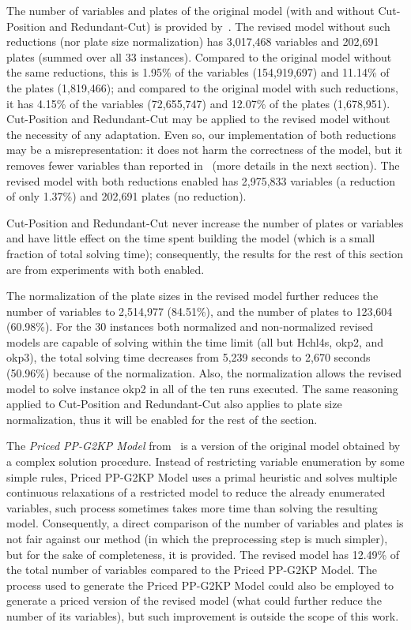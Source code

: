 \documentclass[smallextended]{svjour3}       %
\begin{document}
The number of variables and plates of the original model (with and without Cut-Position and Redundant-Cut) is provided by~\cite{dimitri_thesis}.
The revised model without such reductions (nor plate size normalization) has 3,017,468 variables and 202,691 plates (summed over all 33 instances). Compared to the original model without the same reductions, this is 1.95\% of the variables (154,919,697) and 11.14\% of the plates (1,819,466); and compared to the original model with such reductions, it has 4.15\% of the variables (72,655,747) and 12.07\% of the plates (1,678,951).
Cut-Position and Redundant-Cut may be applied to the revised model without the necessity of any adaptation.
Even so, our implementation of both reductions may be a misrepresentation: it does not harm the correctness of the model, but it removes fewer variables than reported in~\cite{dimitri_thesis} (more details in the next section).
The revised model with both reductions enabled has 2,975,833 variables (a reduction of only 1.37\%) and 202,691 plates (no reduction).

Cut-Position and Redundant-Cut never increase the number of plates or variables and have little effect on the time spent building the model (which is a small fraction of total solving time); consequently, the results for the rest of this section are from experiments with both enabled.

The normalization of the plate sizes in the revised model further reduces the number of variables to 2,514,977 (84.51\%), and the number of plates to 123,604 (60.98\%).
For the 30 instances both normalized and non-normalized revised models are capable of solving within the time limit (all but Hchl4s, okp2, and okp3), the total solving time decreases from 5,239 seconds to 2,670 seconds (50.96\%) because of the normalization.
Also, the normalization allows the revised model to solve instance okp2 in all of the ten runs executed.
The same reasoning applied to Cut-Position and Redundant-Cut also applies to plate size normalization, thus it will be enabled for the rest of the section.

The \emph{Priced PP-G2KP Model} from~\cite{furini:2016} is a version of the original model obtained by a complex solution procedure.
Instead of restricting variable enumeration by some simple rules, Priced PP-G2KP Model uses a primal heuristic and solves multiple continuous relaxations of a restricted model to reduce the already enumerated variables, such process sometimes takes more time than solving the resulting model.
Consequently, a direct comparison of the number of variables and plates is not fair against our method (in which the preprocessing step is much simpler), but for the sake of completeness, it is provided.
The revised model has 12.49\% of the total number of variables compared to the Priced PP-G2KP Model.
The process used to generate the Priced PP-G2KP Model could also be employed to generate a priced version of the revised model (what could further reduce the number of its variables), but such improvement is outside the scope of this work.
\end{document}
